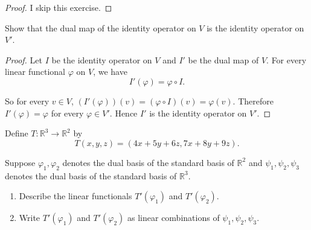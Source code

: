 \begin{proof}
    I skip this exercise.
\end{proof}
\newpage

\begin{exercise}
    Show that the dual map of the identity operator on $V$ is the identity operator
    on $V'$.
\end{exercise}

\begin{proof}
    Let $I$ be the identity operator on $V$ and $I'$ be the dual map of $V$. For every linear functional $\varphi$ on $V$, we have
    \[
        I'(\varphi) = \varphi\circ I.
    \]

    So for every $v\in V$, $(I'(\varphi))(v) = (\varphi\circ I)(v) = \varphi(v)$. Therefore $I'(\varphi) = \varphi$ for every $\varphi\in V'$. Hence $I'$ is the identity operator on $V'$.
\end{proof}
\newpage

\begin{exercise}
    Define $T: \mathbb{R}^{3} \to \mathbb{R}^{2}$ by
    \[
        T(x, y, z) = (4x + 5y + 6z, 7x + 8y + 9z).
    \]

    Suppose $\varphi_{1}, \varphi_{2}$ denotes the dual basis of the standard basis of $\mathbb{R}^{2}$ and $\psi_{1}, \psi_{2}, \psi_{3}$ denotes the dual basis of the standard basis of $\mathbb{R}^{3}$.
    \begin{enumerate}[label={(\alph*)}]
        \item Describe the linear functionals $T'(\varphi_{1})$ and $T'(\varphi_{2})$.
        \item Write $T'(\varphi_{1})$ and $T'(\varphi_{2})$ as linear combinations of $\psi_{1}, \psi_{2}, \psi_{3}$.
    \end{enumerate}
\end{exercise}

